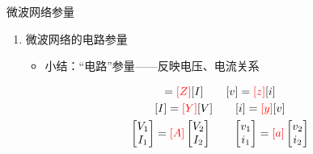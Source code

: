 \begin{frame}{微波网络参量}
    \begin{enumerate}
        \item 微波网络的电路参量
              \begin{itemize}
                  \item 小结：“电路”参量——反映电压、电流关系
              \end{itemize}
              \begin{gather*}
                  [V]={\color{red}{[Z]}}[I] \qquad [v]={\color{red}{[z]}}[i] \\
                  [I]={\color{red}{[Y]}}[V] \qquad [i]={\color{red}{[y]}}[v] \\
                  \begin{bmatrix*}
                      V_1 \\
                      I_1 \\
                  \end{bmatrix*}={\color{red}{[A]}}
                  \begin{bmatrix*}
                      V_2 \\
                      I_2 \\
                  \end{bmatrix*} \qquad
                  \begin{bmatrix*}
                      v_1 \\
                      i_1 \\
                  \end{bmatrix*}={\color{red}{[a]}}
                  \begin{bmatrix*}
                      v_2 \\
                      i_2 \\
                  \end{bmatrix*}
              \end{gather*}
              \saveenum
    \end{enumerate}
\end{frame}

